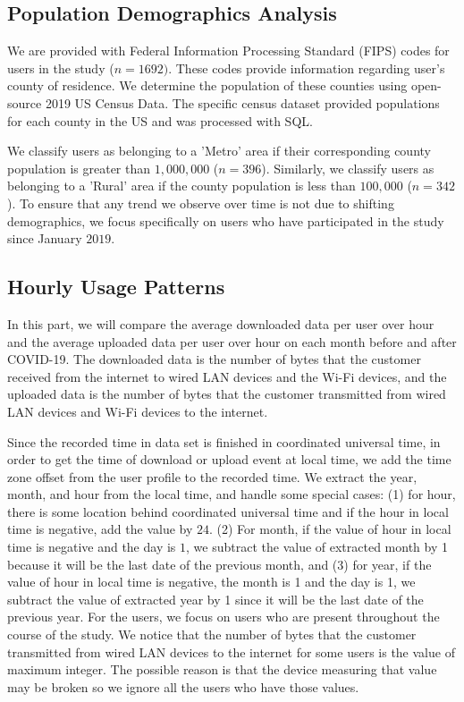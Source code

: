 \documentclass[conference,10pt]{IEEEtran}
\begin{document}

\subsection{Population Demographics Analysis}

We are provided with Federal Information Processing Standard (FIPS) codes for users in the study ($n=1692)$. These codes provide information regarding user's county of residence. We determine the population of these counties using open-source 2019 US Census Data. The specific census dataset provided populations for each county in the US and was processed with SQL.

We classify users as belonging to a 'Metro' area if their corresponding county population is greater than $1,000,000$ ($n=396$). Similarly, we classify users as belonging to a 'Rural' area if the county population is less than $100,000$ ($n=342$). To ensure that any trend we observe over time is not due to shifting demographics, we focus specifically on users who have participated in the study since January $2019$.

\subsection{Hourly Usage Patterns}

In this part, we will compare the average downloaded data per user over hour and the average uploaded data per user over hour on each month before and after COVID-19. The downloaded data is the number of bytes that the customer received from the internet to wired LAN devices and the Wi-Fi devices, and the uploaded data is the number of bytes that the customer transmitted from wired LAN devices and Wi-Fi devices to the internet.

Since the recorded time in data set is finished in coordinated universal time, in order to get the time of download or upload event at local time, we add the time zone offset from the user profile to the recorded time.  We extract the year, month, and hour from the local time, and handle some special cases: (1) for hour, there is some location behind coordinated universal time and if the hour in local time is negative, add the value by $24$. (2) For month, if the value of hour in local time is negative and the day is $1$, we subtract the value of extracted month by 1 because it will be the last date of the previous month, and (3) for year, if the value of hour in local time is negative, the month is 1 and the day is 1, we subtract the value of extracted year by 1 since it will be the last date of the previous year. For the users, we focus on users who are present throughout the course of the study. We notice that the number of bytes that the customer transmitted from wired LAN devices to the internet for some users is the value of maximum integer. The possible reason is that the device measuring that value may be broken so we ignore all the users who have those values.
\end{document}
